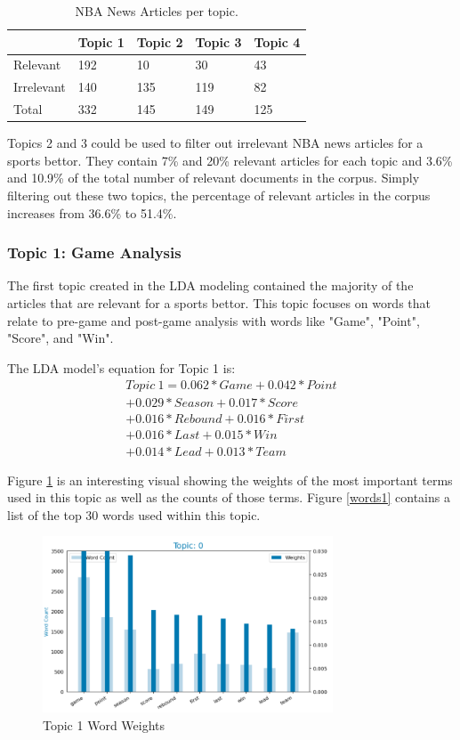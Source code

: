 \documentclass[5p,authoryear]{elsarticle}
\begin{document}
\begin{table}[!htb] 
  \centering 
  \begin{tabular}{@{\small}lllll@{}} 
    \toprule %
    & {\footnotesize Topic 1} &  {\footnotesize Topic 2} & {\footnotesize Topic 3} & {\footnotesize Topic 4} \\ \midrule
    Relevant & 192 & 10 & 30 & 43 \\
    Irrelevant & 140 & 135 & 119 & 82 \\
    Total & 332 & 145 & 149 & 125 \\
    \bottomrule
\end{tabular} \caption{NBA News Articles per topic. } \label{table_topic}
\end{table}

Topics 2 and 3 could be used to filter out irrelevant NBA news articles for a sports bettor. 
They contain 7\% and 20\% relevant articles for each topic and 3.6\% and 10.9\% of the total number of relevant documents in the corpus. 
Simply filtering out these two topics, the percentage of relevant articles in the corpus increases from 36.6\% to 51.4\%.



\subsubsection{Topic 1: Game Analysis}

The first topic created in the LDA modeling contained the majority of the articles that are relevant for a sports bettor.
This topic focuses on words that relate to pre-game and post-game analysis with words like "Game", "Point", "Score", and "Win".

The LDA model's equation for Topic 1 is:
\begin{align*}
    Topic\ 1 = 0.062*Game + 0.042*Point \\
    + 0.029*Season + 0.017*Score \\
    + 0.016*Rebound + 0.016*First \\
    + 0.016*Last + 0.015*Win \\
    + 0.014*Lead + 0.013*Team
    \label{eq:1}
\end{align*}

Figure \ref{weights1} is an interesting visual showing the weights of the most important terms used in this topic as well as the counts of those terms. 
Figure \ref{words1} contains a list of the top 30 words used within this topic.

\begin{figure}[!htb] \centering
	\includegraphics[width=3.4in]{figures/Topic0_words.png}
	\caption[]{Topic 1 Word Weights} 
	\label{weights1} 
\end{figure}
\end{document}
